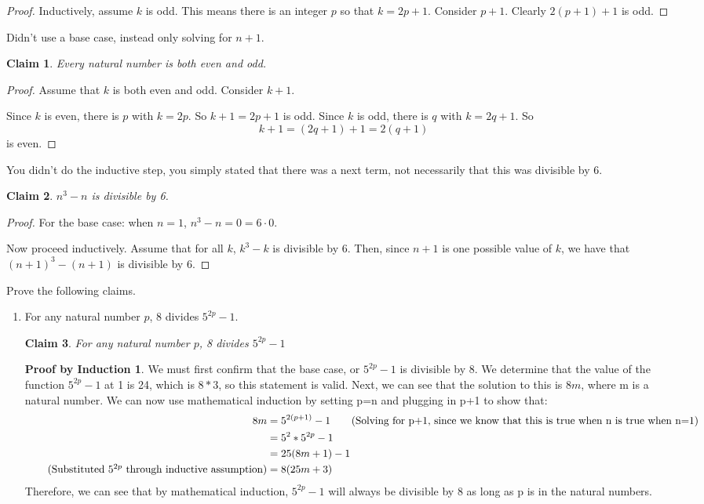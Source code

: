 \documentclass[11pt]{letter}
\newtheorem{claim}{Claim}
\theoremstyle{definition}
\newtheorem{PBI}{Proof by Induction}
\begin{document}
\begin{description}
\begin{enumerate}
\begin{proof}
					Inductively, assume $k$ is odd. This means there is an integer $p$ so that $k=2p+1$. Consider $p+1$. Clearly $2(p+1)+1$ is odd.
				\end{proof}
				Didn't use a base case, instead only solving for $n+1$. 
				\begin{claim}
					Every natural number is both even and odd.
				\end{claim}
				\begin{proof}
					Assume that $k$ is both even and odd. Consider $k+1$.
					
					Since $k$ is even, there is $p$ with $k=2p$. So $k+1=2p+1$ is odd. Since $k$ is odd, there is $q$ with $k=2q+1$. So $$k+1=(2q+1)+1=2(q+1)$$is even.
				\end{proof}
                                You didn't do the inductive step, you simply stated that there was a next term, not necessarily that this was divisible by 6.
				\begin{claim}
					$n^3-n$ is divisible by 6.
				\end{claim}
				\begin{proof}
					For the base case: when $n=1$, $n^3-n=0=6\cdot 0$.
					
					Now proceed inductively. Assume that for all $k$, $k^3-k$ is divisible by 6. Then, since $n+1$ is one possible value of $k$, we have that $(n+1)^3-(n+1)$ is divisible by 6. 
				\end{proof}

		\end{enumerate}
	\item[proofs] Prove the following claims. 
          \setcounter{claim}{0}
		\begin{enumerate}
			\item For any natural number $p$, 8 divides $5^{2p}-1$.
\begin{claim}
For any natural number $p$, 8 divides $5^{2p}-1$
\end{claim}
\begin{PBI}
We must first confirm that the base case, or $5^{2p}-1$ is divisible by 8. We determine that the value of the function $5^{2p}-1$ at 1 is 24, which is $8*3$, so this statement is valid. Next, we can see that the solution to this is $8m$, where m is a natural number. We can now use mathematical induction by setting p=n and plugging in p+1 to show that: \\
\begin{align*}
8m &= 5^{2(p+1)}-1 \tag{Solving for p+1, since we know that this is true when n is true when n=1} \\
&= 5^2*5^{2p}-1 \\
&=25(8m+1)-1 \\ \tag{Substituted $5^{2p}$ through inductive assumption}
&=8(25m+3) \\
\end{align*}
Therefore, we can see that by mathematical induction, $5^{2p}-1$ will always be divisible by 8 as long as p is in the natural numbers. \\
\end{PBI}


\end{enumerate}
\end{description}
\end{document}
